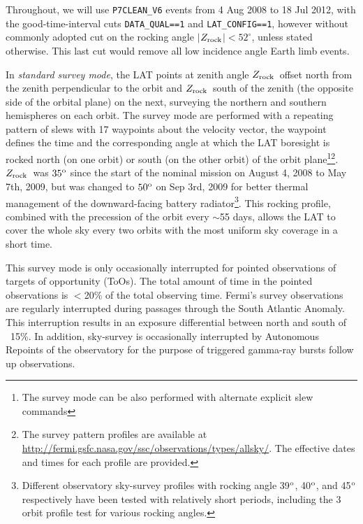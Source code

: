 \documentclass[aps,twocolumn,prd,superscriptaddress,showpacs,nofootinbib,fixfloat]{revtex4}
\newcommand{\degree}{^{\rm o}}
\newcommand{\zrock}{$Z_{\rm rock}$}
\begin{document}
Throughout, we will use \texttt{P7CLEAN\_V6} events from 4
Aug 2008 to 18 Jul 2012, with the good-time-interval cuts
\texttt{DATA\_QUAL==1} and \texttt{LAT\_CONFIG==1}, however
without commonly adopted cut on the rocking angle
$|$\zrock$|<52^\circ$, unless stated otherwise. This last cut would remove
all low incidence angle Earth limb events.
\medskip

In \emph{standard survey mode}, the LAT points at zenith
angle \zrock\ offset north from the zenith perpendicular to
the orbit and \zrock\ south of the zenith (the opposite side
of the orbital plane) on the next, surveying the northern
and southern hemispheres on each orbit. The survey mode are
performed with a repeating pattern of slews with 17
waypoints about the velocity vector, the waypoint defines
the time and the corresponding angle at which the LAT
boresight is rocked north (on one orbit) or south (on the
other orbit) of the orbit plane\footnote{The survey mode can
be also performed with alternate explicit slew
commands}\footnote{The survey pattern profiles are available
at
\url{http://fermi.gsfc.nasa.gov/ssc/observations/types/allsky/}.
The effective dates and times for each profile are provided.
}. \zrock\ was $35\degree$ since the start of the nominal
mission on August 4, 2008 to May 7th, 2009, but was changed
to $50\degree$ on Sep 3rd, 2009 for better thermal
management of the downward-facing battery
radiator\footnote{Different observatory sky-survey profiles
with rocking angle 39$\degree$, 40$\degree$, and 45$\degree$
respectively have been tested with relatively short periods,
including the 3 orbit profile test for various rocking
angles.}. This rocking profile, combined with the precession
of the orbit every $\sim$55 days, allows the LAT to cover
the whole sky every two orbits with the most uniform sky
coverage in a short time.

This survey mode is only occasionally interrupted for
pointed observations of targets of opportunity (ToOs). The
total amount of time in the pointed observations is $<$20\%
of the total observing time. Fermi's survey observations are
regularly interrupted during passages through the South
Atlantic Anomaly. This interruption results in an exposure
differential between north and south of ~15\%. In addition,
sky-survey is occasionally interrupted by Autonomous
Repoints of the observatory for the purpose of triggered
gamma-ray bursts follow up observations.  \medskip
\end{document}
